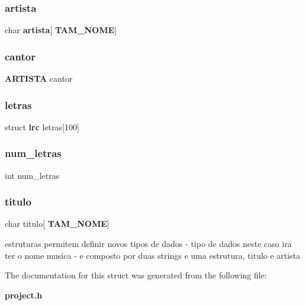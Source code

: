 \mbox{\label{structmusica_a3ece80975d3e1263d85091ba633e7690}} 
\subsubsection{artista}
{\footnotesize\ttfamily char \textbf{ artista}[\textbf{ T\+A\+M\+\_\+\+N\+O\+ME}]}

\mbox{\label{structmusica_a8b6fc763fbedbcbdf1ed51a276b15e9b}} 
\subsubsection{cantor}
{\footnotesize\ttfamily \textbf{ A\+R\+T\+I\+S\+TA} cantor}

\mbox{\label{structmusica_a5243e7f8641c5be23da1e7391c8fc4d6}} 
\subsubsection{letras}
{\footnotesize\ttfamily struct \textbf{ lrc} letras[100]}

\mbox{\label{structmusica_a65092ca80b96aad412ee3f06c9b506e3}} 
\subsubsection{num\_letras}
{\footnotesize\ttfamily int num\+\_\+letras}

\mbox{\label{structmusica_a6dba2e20e00fd8307192a7e0dce4b3d9}} 
\subsubsection{titulo}
{\footnotesize\ttfamily char titulo[\textbf{ T\+A\+M\+\_\+\+N\+O\+ME}]}



estruturas permitem definir novos tipos de dados -\/ tipo de dados neste caso ira ter o nome musica -\/ e composto por duas strings e uma estrutura, titulo e artista 



The documentation for this struct was generated from the following file\+:\begin{DoxyCompactItemize}
\item 
\textbf{ project.\+h}\end{DoxyCompactItemize}
